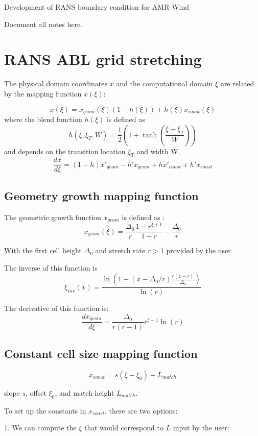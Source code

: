 \documentclass{article}
\begin{document}
\begin{center}
{\Large{}Development of RANS boundary condition for
  AMR-Wind}{\Large\par} \par\end{center}

Document all notes here.

\section{RANS ABL grid stretching}

The physical domain coordinates $x$ and the computational domain $\xi$
are related by the mapping function $x(\xi)$:

$$
x(\xi) = x_{geom}(\xi) (1-h(\xi)) + h(\xi) x_{const}(\xi)
$$
where the blend function $h(\xi)$ is defined as  
$$
h(\xi, \xi_T, W) = \frac{1}{2} \left( 1 + \tanh \left( \frac{\xi-\xi_T}{W} \right) \right)
$$
and depends on the transition location $\xi_T$ and width W.  
$$
\frac{d x}{d \xi} = (1-h) x'_{geom} - h' x_{geom} + h x'_{const} + h' x_{const}
$$

\subsection{Geometry growth mapping function}

The geometric growth function $x_{geom}$ is defined as :  
$$
x_{geom}(\xi) = \frac{\Delta_0}{r}  \frac{1-r^{\xi+1}}{1-r} - \frac{\Delta_0}{r}
$$

With the first cell height $\Delta_0$ and stretch rate $r>1$ provided
by the user.

The inverse of this function is
$$
\xi_{inv}(x) = \frac{\ln \left( 1- (x-\Delta_0/r) \frac{r (1-r)}{\Delta_0} \right)}
{\ln (r)}
$$

The derivative of this function is:
$$
\frac{d x_{geom}}{d\xi} = \frac{\Delta_0}{r (r-1)} r^{\xi-1} \ln(r)
$$

\subsection{Constant cell size mapping function}

$$
x_{const} = s(\xi-\xi_0) + L_{match}
$$

slope $s$, offset $\xi_0$, and match height $L_{match}$.

To set up the constants in $x_{const}$, there are two options:

1.  We can compute the $\xi$ that would correspond to $L$ input by the user:
\end{document}
